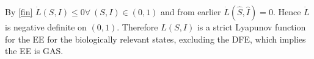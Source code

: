 By \ref{fin} $\dot{L}(S,I) \leq 0 \forall\ (S,I) \in (0,1)$ and from earlier $\dot{L}(\hat{S},\hat{I}) = 0$.
Hence $\dot{L}$ is negative definite on $(0,1)$.
Therefore $L(S,I)$ is a strict Lyapunov function for the EE for the biologically relevant states, excluding the DFE, which implies the EE is GAS.

